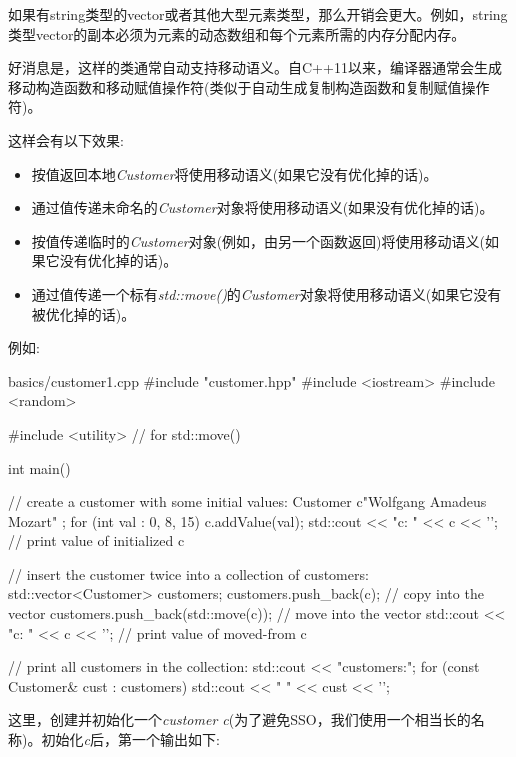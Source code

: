 如果有string类型的vector或者其他大型元素类型，那么开销会更大。例如，string类型vector的副本必须为元素的动态数组和每个元素所需的内存分配内存。\par

好消息是，这样的类通常自动支持移动语义。自C++11以来，编译器通常会生成移动构造函数和移动赋值操作符(类似于自动生成复制构造函数和复制赋值操作符)。\par

这样会有以下效果:\par

\begin{itemize}
  \item 按值返回本地\textit{Customer}将使用移动语义(如果它没有优化掉的话)。
  \item 通过值传递未命名的\textit{Customer}对象将使用移动语义(如果没有优化掉的话)。
  \item 按值传递临时的\textit{Customer}对象(例如，由另一个函数返回)将使用移动语义(如果它没有优化掉的话)。
  \item 通过值传递一个标有\textit{std::move()}的\textit{Customer}对象将使用移动语义(如果它没有被优化掉的话)。
\end{itemize}

例如:\par

\begin{codeboxt}[cpp]{basics/customer1.cpp}
#include "customer.hpp"
#include <iostream>
#include <random>

#include <utility> // for std::move()

int main()
{
  // create a customer with some initial values:
  Customer c{"Wolfgang Amadeus Mozart" };
  for (int val : {0, 8, 15}) {
    c.addValue(val);
  }
  std::cout << "c: " << c << '\n'; // print value of initialized c

  // insert the customer twice into a collection of customers:
  std::vector<Customer> customers;
  customers.push_back(c); // copy into the vector
  customers.push_back(std::move(c)); // move into the vector
  std::cout << "c: " << c << '\n'; // print value of moved-from c

  // print all customers in the collection:
  std::cout << "customers:\n";
  for (const Customer& cust : customers) {
    std::cout << " " << cust << '\n';
  }
}
\end{codeboxt}

这里，创建并初始化一个\textit{customer c}(为了避免SSO，我们使用一个相当长的名称)。初始化\textit{c}后，第一个输出如下:\par

